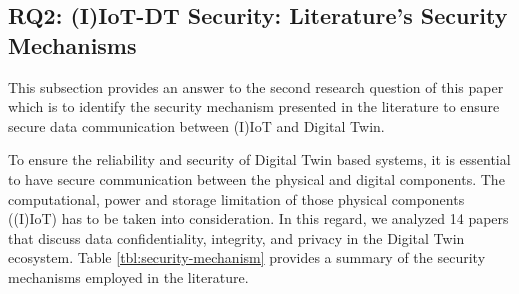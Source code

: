 %
%



\subsection{RQ2: (I)IoT-DT Security: Literature's Security Mechanisms}
\label{sec:rq2secmech}
This subsection provides an answer to the second research question of this paper which is to identify the security mechanism presented in the literature to ensure secure data communication between (I)IoT and Digital Twin.

To ensure the reliability and security of Digital Twin based systems, it is essential to have secure communication between the physical and digital components. The computational, power and storage limitation of those physical components ((I)IoT) has to be taken into consideration. In this regard, we analyzed 14 papers that discuss data confidentiality, integrity, and privacy in the Digital Twin ecosystem. Table \ref{tbl:security-mechanism} provides a summary of  the security mechanisms employed in the literature. 

